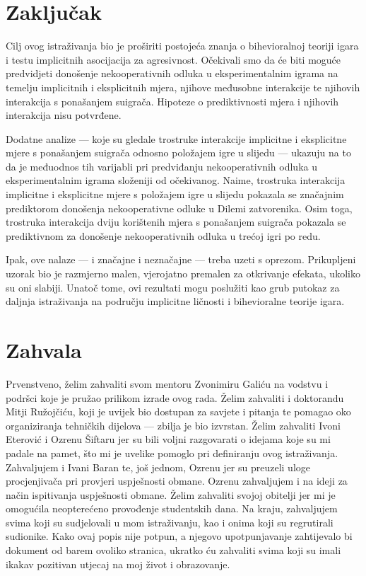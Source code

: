 \documentclass[a4paper, 12pt]{report}
\begin{document}
\section{Zaključak}

Cilj ovog istraživanja bio je proširiti postojeća znanja o bihevioralnoj teoriji
igara i testu implicitnih asocijacija za agresivnost. Očekivali smo da će biti
moguće predvidjeti donošenje nekooperativnih odluka u eksperimentalnim igrama na
temelju implicitnih i eksplicitnih mjera, njihove međusobne interakcije te
njihovih interakcija s ponašanjem suigrača. Hipoteze o prediktivnosti mjera i
njihovih interakcija nisu potvrđene. 

Dodatne analize --- koje su gledale trostruke
interakcije implicitne i eksplicitne mjere s ponašanjem suigrača odnosno
položajem igre u slijedu --- ukazuju na to da je međuodnos tih varijabli pri
predviđanju nekooperativnih odluka u eksperimentalnim igrama složeniji od
očekivanog. Naime, trostruka interakcija implicitne i eksplicitne mjere
s položajem igre u slijedu pokazala se značajnim prediktorom donošenja
nekooperativne odluke u Dilemi zatvorenika. Osim toga, trostruka interakcija
dviju korištenih mjera s ponašanjem suigrača pokazala se prediktivnom za
donošenje nekooperativnih odluka u trećoj igri po redu. 

Ipak, ove nalaze --- i značajne i neznačajne --- treba uzeti s oprezom.
Prikupljeni uzorak bio je razmjerno malen, vjerojatno premalen za otkrivanje
efekata, ukoliko su oni slabiji. Unatoč tome, ovi rezultati mogu poslužiti kao
grub putokaz za daljnja istraživanja na području implicitne ličnosti i
bihevioralne teorije igara.

\section{Zahvala}

Prvenstveno, želim zahvaliti svom mentoru Zvonimiru Galiću na vodstvu i podršci
koje je pružao prilikom izrade ovog rada. Želim zahvaliti i doktorandu Mitji
Ružojčiću, koji je uvijek bio dostupan za savjete i pitanja te pomagao oko
organiziranja tehničkih dijelova --- zbilja je bio izvrstan.
Želim zahvaliti Ivoni Eterović i Ozrenu Šiftaru jer su bili voljni
razgovarati o idejama koje su mi padale na pamet, što mi je uvelike
pomoglo pri definiranju ovog istraživanja. Zahvaljujem i Ivani Baran te, još
jednom, Ozrenu jer su preuzeli uloge procjenjivača pri provjeri
uspješnosti obmane. Ozrenu zahvaljujem i na ideji za način
ispitivanja uspješnosti obmane. Želim zahvaliti svojoj obitelji jer
mi je omogućila neopterećeno provođenje studentskih dana. Na kraju,
zahvaljujem svima koji su sudjelovali u mom istraživanju, kao i onima
koji su regrutirali sudionike. Kako ovaj popis nije potpun, a
njegovo upotpunjavanje zahtijevalo bi dokument od barem ovoliko
stranica, ukratko ću zahvaliti svima koji su imali ikakav pozitivan utjecaj na moj
život i obrazovanje.
\end{document}
